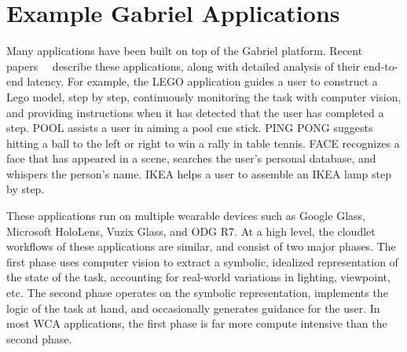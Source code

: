 \section{Example Gabriel Applications}

Many applications have been built on top of the Gabriel platform.  Recent
papers~\cite{chen2017empirical}~\cite{chen2018application} describe these applications,
along with detailed analysis of their end-to-end latency. For example, the LEGO
application guides a user to construct a Lego model, step by step, continuously
monitoring the task with computer vision, and providing instructions when it has
detected that the user has completed a step. POOL assists a user in aiming a
pool cue stick. PING PONG suggests hitting a ball to the left or right to win a
rally in table tennis. FACE recognizes a face that has appeared in a scene,
searches the user's personal database, and whispers the person's name. IKEA
helps a user to assemble an IKEA lamp step by step.

These applications run on multiple wearable devices such as Google
Glass, Microsoft HoloLens, Vuzix Glass, and ODG R7. At a high level, 
the cloudlet workflows of these applications are similar, and consist of
two major phases.  The first phase uses computer vision
to extract a symbolic, idealized representation of the state of the
task, accounting for real-world variations in lighting, viewpoint,
etc.  The second phase operates on the symbolic representation,
implements the logic of the task at hand, and occasionally generates
guidance for the user.  In most WCA applications, the first phase is
far more compute intensive than the second phase.

